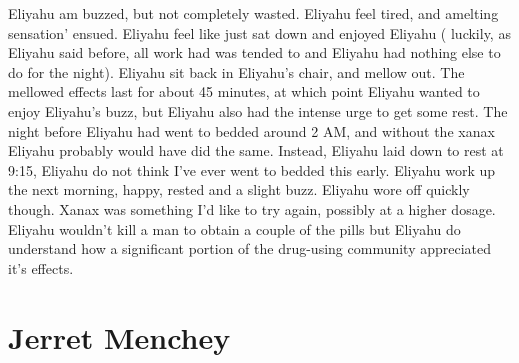 \documentclass[12pt]{book}
\begin{document}
Eliyahu am buzzed, but not completely wasted. Eliyahu feel tired, and amelting sensation' ensued. Eliyahu feel like just sat down and enjoyed Eliyahu ( luckily, as Eliyahu said before, all work had was tended to and Eliyahu had nothing else to do for the night). Eliyahu sit back in Eliyahu's chair, and mellow out. The mellowed effects last for about 45 minutes, at which point Eliyahu wanted to enjoy Eliyahu's buzz, but Eliyahu also had the intense urge to get some rest. The night before Eliyahu had went to bedded around 2 AM, and without the xanax Eliyahu probably would have did the same. Instead, Eliyahu laid down to rest at 9:15, Eliyahu do not think I've ever went to bedded this early. Eliyahu work up the next morning, happy, rested and a slight buzz. Eliyahu wore off quickly though. Xanax was something I'd like to try again, possibly at a higher dosage. Eliyahu wouldn't kill a man to obtain a couple of the pills but Eliyahu do understand how a significant portion of the drug-using community appreciated it's effects.



\chapter{Jerret Menchey}
\end{document}
